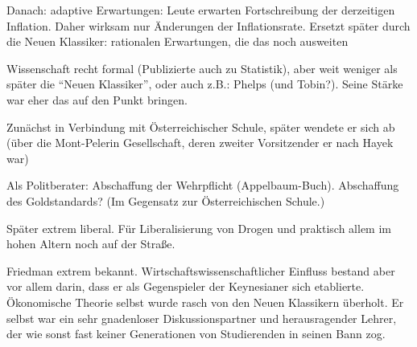Danach: adaptive Erwartungen: Leute erwarten Fortschreibung der derzeitigen Inflation. Daher wirksam nur Änderungen der Inflationsrate. Ersetzt später durch die Neuen Klassiker: rationalen Erwartungen, die das noch ausweiten


Wissenschaft recht formal (Publizierte auch zu Statistik), aber weit weniger als später die "`Neuen Klassiker"', oder auch z.B.: Phelps (und Tobin?). Seine Stärke war eher das auf den Punkt bringen.











Zunächst in Verbindung mit Österreichischer Schule, später wendete er sich ab (über die Mont-Pelerin Gesellschaft, deren zweiter Vorsitzender er nach Hayek war)


Als Politberater: Abschaffung der Wehrpflicht (Appelbaum-Buch). Abschaffung des Goldstandards? (Im Gegensatz zur Österreichischen Schule.)




Später extrem liberal. Für Liberalisierung von Drogen und praktisch allem im hohen Altern noch auf der Straße.

Friedman extrem bekannt. Wirtschaftswissenschaftlicher Einfluss bestand aber vor allem darin, dass er als Gegenspieler der Keynesianer sich etablierte. Ökonomische Theorie selbst wurde rasch von den Neuen Klassikern überholt. Er selbst war ein sehr gnadenloser Diskussionspartner und herausragender Lehrer, der wie sonst fast keiner Generationen von Studierenden in seinen Bann zog. 




